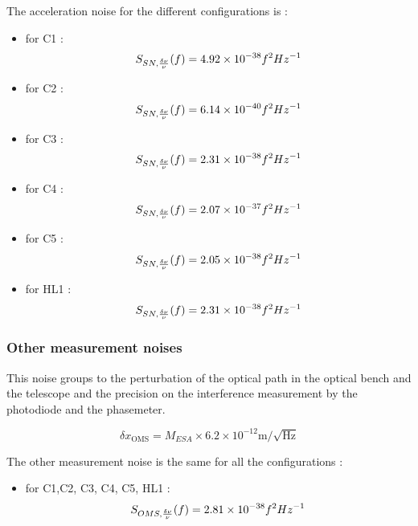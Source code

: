 \documentclass{iopart}
\begin{document}
The acceleration noise for the different configurations is :
\begin{itemize}
\item for C1 : 
\begin{equation}
S_{SN, {\delta \nu \over \nu}} (f)  =  4.92 \times10^{-38} f^2 Hz^{-1}
\end{equation}
\item for C2 : 
\begin{equation}
S_{SN, {\delta \nu \over \nu}} (f)  =  6.14 \times10^{-40} f^2 Hz^{-1}
\end{equation}
\item for C3 : 
\begin{equation}
S_{SN, {\delta \nu \over \nu}} (f)  =  2.31 \times10^{-38} f^2 Hz^{-1}
\end{equation}
\item for C4 : 
\begin{equation}
S_{SN, {\delta \nu \over \nu}} (f)  =  2.07 \times10^{-37} f^2 Hz^{-1}
\end{equation}
\item for C5 : 
\begin{equation}
S_{SN, {\delta \nu \over \nu}} (f)  =  2.05 \times10^{-38} f^2 Hz^{-1}
\end{equation}
\item for HL1 : 
\begin{equation}
S_{SN, {\delta \nu \over \nu}} (f)  =  2.31 \times10^{-38} f^2 Hz^{-1}
\end{equation}
\end{itemize}



\subsubsection{Other measurement noises}
\label{SSS:Inst:Noises:OMS}

This noise groups to the perturbation of the optical path in the optical bench and the telescope and  the precision on the interference measurement by the photodiode and the phasemeter. 



\begin{equation}
\delta x_{\textrm{OMS}} = M_{ESA} \times 6.2 \times 10^{-12}   \textrm{m}/\sqrt{\textrm{Hz}} 
\end{equation}


The other measurement noise is the same for all the configurations :
\begin{itemize}
\item for C1,C2, C3, C4, C5, HL1 : 
\begin{equation}
S_{OMS, {\delta \nu \over \nu}} (f)  =  2.81 \times10^{-38} f^2 Hz^{-1}
\end{equation}
\end{itemize}
\end{document}
